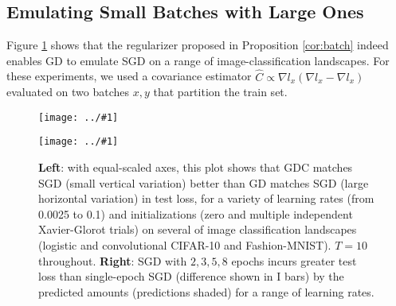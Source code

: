 \documentclass{article}
\theoremstyle{plain}
\theoremstyle{definition}
\newcommand{\plotmoo}[3]{
    \texttt{[image: ../\#1]}
}
\begin{document}
    \subsection{Emulating Small Batches with Large Ones}
        Figure \ref{fig:bmmulti} shows that the regularizer proposed in
        Proposition \ref{cor:batch} indeed enables GD to emulate SGD
        on a range of image-classification landscapes.  For these experiments,
        we used a covariance
        estimator $\hat C \propto \nabla l_x (\nabla l_x - \nabla l_x)$ evaluated on
        two batches $x, y$ that partition the train set.
        \begin{figure}[h!] 
            \centering
            \plotmoo{plots/big-bm-new}{0.48\columnwidth}{4.0cm}
            \plotmoo{plots/multi-fashion-logistic-0}{0.48\columnwidth}{4.0cm}
            \caption{
                {\bf Left}: with equal-scaled axes, this plot shows that GDC
                matches SGD (small vertical variation) better than GD matches
                SGD (large horizontal variation) in test loss, for a variety of
                learning rates (from 0.0025 to 0.1) and initializations (zero
                and multiple independent Xavier-Glorot trials) on several of
                image classification landscapes (logistic and convolutional
                CIFAR-10 and Fashion-MNIST).  $T=10$ throughout.
                {\bf Right}: SGD with $2, 3, 5, 8$ epochs incurs greater test
                loss than single-epoch SGD (difference shown in I bars) by the
                predicted amounts (predictions shaded) for a range of learning
                rates.
            }
            \label{fig:bmmulti}
        \end{figure}
  
\end{document}
